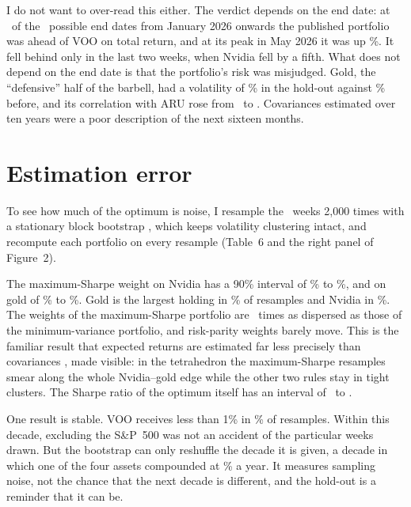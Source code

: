 \documentclass[11pt,a4paper]{article}
\begin{document}
I do not want to over-read this either. The verdict depends on the end date: at \hoEndAhead\ of the \hoEndTotal\ possible end dates from January 2026 onwards the published portfolio was ahead of VOO on total return, and at its peak in May 2026 it was up \hoPeak\%. It fell behind only in the last two weeks, when Nvidia fell by a fifth. What does not depend on the end date is that the portfolio's risk was misjudged. Gold, the ``defensive'' half of the barbell, had a volatility of \hoSglnVol\% in the hold-out against \isSglnVol\% before, and its correlation with ARU rose from \isCorrAruSgln\ to \hoCorrAruSgln. Covariances estimated over ten years were a poor description of the next sixteen months.

\section{Estimation error}

To see how much of the optimum is noise, I resample the \nWeeks\ weeks 2{,}000 times with a stationary block bootstrap \citep{politis}, which keeps volatility clustering intact, and recompute each portfolio on every resample (Table~6 and the right panel of Figure~2).

\begin{table}[ht]
\centering\small
\caption{Optimal weights and their 90\% bootstrap intervals (per cent)}

\end{table}

The maximum-Sharpe weight on Nvidia has a 90\% interval of \bootNvdaLo\% to \bootNvdaHi\%, and on gold of \bootSglnLo\% to \bootSglnHi\%. Gold is the largest holding in \bootSglnLargest\% of resamples and Nvidia in \bootNvdaLargest\%. The weights of the maximum-Sharpe portfolio are \bootRatio\ times as dispersed as those of the minimum-variance portfolio, and risk-parity weights barely move. This is the familiar result that expected returns are estimated far less precisely than covariances \citep{merton}, made visible: in the tetrahedron the maximum-Sharpe resamples smear along the whole Nvidia--gold edge while the other two rules stay in tight clusters. The Sharpe ratio of the optimum itself has an interval of \bootSharpeLo\ to \bootSharpeHi.

One result is stable. VOO receives less than 1\% in \bootVooZero\% of resamples. Within this decade, excluding the S\&P~500 was not an accident of the particular weeks drawn. But the bootstrap can only reshuffle the decade it is given, a decade in which one of the four assets compounded at \nvdaCagr\% a year. It measures sampling noise, not the chance that the next decade is different, and the hold-out is a reminder that it can be.
\end{document}
